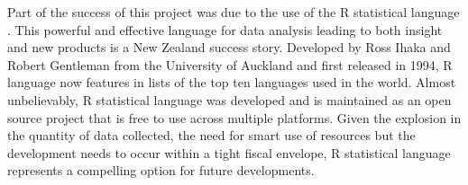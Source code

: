\documentclass[11pt]{article}
\begin{document}
Part of the success of this project was due to the use of the R statistical language \citep{rstat2013}. This powerful and effective language for data analysis leading to both insight and new products is a New Zealand success story. Developed by Ross Ihaka and Robert Gentleman from the University of Auckland and first released in 1994, R language now features in lists of the top ten languages used in the world. Almost unbelievably, R statistical language was developed and is maintained as an open source project that is free to use across multiple platforms. Given the explosion in the quantity of data collected, the need for smart use of resources but the development needs to occur within a tight fiscal envelope, R statistical language represents a compelling option for future developments. \\





\end{document}

